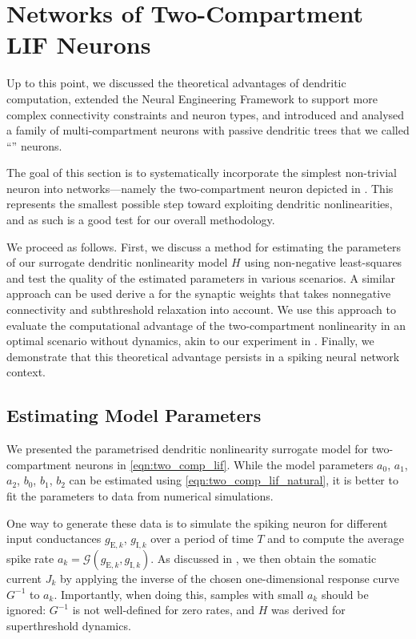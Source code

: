 
\section{Networks of Two-Compartment LIF Neurons}
\label{sec:two_comp_lif}

Up to this point, we discussed the theoretical advantages of dendritic computation, extended the Neural Engineering Framework to support more complex connectivity constraints and neuron types, and introduced and analysed a family of multi-compartment \LIF neurons with passive dendritic trees that we called \enquote{\nlif} neurons.

The goal of this section is to systematically incorporate the simplest non-trivial \nlif neuron into \NEF networks---namely the two-compartment \LIF neuron depicted in .
This represents the smallest possible step toward exploiting dendritic nonlinearities, and as such is a good test for our overall methodology.

We proceed as follows.
First, we discuss a method for estimating the parameters of our surrogate dendritic nonlinearity model $H$ using non-negative least-squares and test the quality of the estimated parameters in various scenarios.
A similar approach can be used derive a \qprog for the synaptic weights that takes nonnegative connectivity and subthreshold relaxation into account.
We use this approach to evaluate the computational advantage of the two-compartment \LIF nonlinearity in an optimal scenario without dynamics, akin to our experiment in .
Finally, we demonstrate that this theoretical advantage persists in a spiking neural network context.

\subsection{Estimating Model Parameters}
\label{sec:two_comp_lif_fit_model}

We presented the parametrised dendritic nonlinearity surrogate model for two-compartment \LIF neurons in \cref{eqn:two_comp_lif}.
While the model parameters $a_0$, $a_1$, $a_2$, $b_0$, $b_1$, $b_2$ can be estimated using \cref{eqn:two_comp_lif_natural}, it is better to fit the parameters to data from numerical simulations.

One way to generate these data is to simulate the spiking neuron for different input conductances $g_{\mathrm{E}, k}$, $g_{\mathrm{I}, k}$ over a period of time $T$ and to compute the average spike rate $a_k = \mathscr{G}( g_{\mathrm{E}, k}, g_{\mathrm{I}, k})$.
As discussed in , we then obtain the somatic current $J_k$ by applying the inverse of the chosen one-dimensional response curve $G^{-1}$ to $a_k$.
Importantly, when doing this, samples with small $a_k$ should be ignored: $G^{-1}$ is not well-defined for zero rates, and $H$ was derived for superthreshold dynamics.


